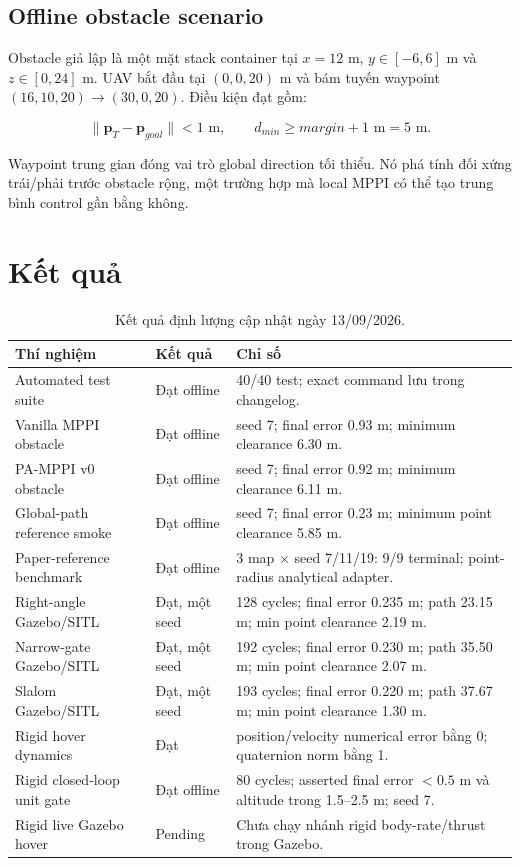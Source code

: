 \documentclass[11pt,a4paper]{article}
\newcommand{\vect}[1]{\bm{#1}}
\begin{document}
\subsection{Offline obstacle scenario}

Obstacle giả lập là một mặt stack container tại $x=12$ m, $y\in[-6,6]$ m và
$z\in[0,24]$ m. UAV bắt đầu tại $(0,0,20)$ m và bám tuyến waypoint
$(16,10,20)\rightarrow(30,0,20)$. Điều kiện đạt gồm:

\begin{equation}
\|\vect p_T-\vect p_{goal}\|<1\text{ m},
\qquad d_{min}\geq margin+1\text{ m}=5\text{ m}.
\end{equation}

Waypoint trung gian đóng vai trò global direction tối thiểu. Nó phá tính đối
xứng trái/phải trước obstacle rộng, một trường hợp mà local MPPI có thể tạo
trung bình control gần bằng không.

\section{Kết quả}

\begin{table}[ht]
\centering
\caption{Kết quả định lượng cập nhật ngày 13/09/2026.}
\label{tab:results}
\footnotesize
\renewcommand{\arraystretch}{1.08}
\begin{tabularx}{\textwidth}{L{0.31\textwidth}L{0.20\textwidth}Y}
\toprule
\textbf{Thí nghiệm} & \textbf{Kết quả} & \textbf{Chỉ số} \\
\midrule
Automated test suite & Đạt offline & 40/40 test; exact command lưu trong changelog. \\
Vanilla MPPI obstacle & Đạt offline & seed 7; final error 0.93 m; minimum clearance 6.30 m. \\
PA-MPPI v0 obstacle & Đạt offline & seed 7; final error 0.92 m; minimum clearance 6.11 m. \\
Global-path reference smoke & Đạt offline & seed 7; final error 0.23 m; minimum point clearance 5.85 m. \\
Paper-reference benchmark & Đạt offline & 3 map $\times$ seed 7/11/19: 9/9 terminal; point-radius analytical adapter. \\
Right-angle Gazebo/SITL & Đạt, một seed & 128 cycles; final error 0.235 m; path 23.15 m; min point clearance 2.19 m. \\
Narrow-gate Gazebo/SITL & Đạt, một seed & 192 cycles; final error 0.230 m; path 35.50 m; min point clearance 2.07 m. \\
Slalom Gazebo/SITL & Đạt, một seed & 193 cycles; final error 0.220 m; path 37.67 m; min point clearance 1.30 m. \\
Rigid hover dynamics & Đạt & position/velocity numerical error bằng 0;
quaternion norm bằng 1. \\
Rigid closed-loop unit gate & Đạt offline & 80 cycles; asserted final error $<0.5$ m và altitude trong 1.5--2.5 m; seed 7. \\
Rigid live Gazebo hover & Pending & Chưa chạy nhánh rigid body-rate/thrust trong Gazebo. \\
\bottomrule
\end{tabularx}
\end{table}
\end{document}
